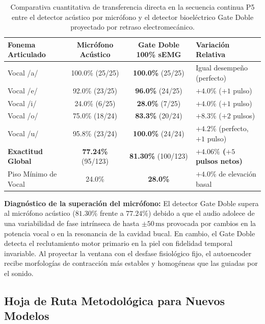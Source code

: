 \documentclass[11pt,a4paper,openany]{book}
\theoremstyle{definition}
\begin{document}
\begin{table}[H]
\centering
\begin{tabularx}{\textwidth}{p{4.5cm} c c X}
\toprule
\textbf{Fonema Articulado} & \textbf{Micrófono Acústico} & \textbf{Gate Doble 100\% sEMG} & \textbf{Variación Relativa} \\
\midrule
Vocal /a/ & 100.0\% (25/25) & \textbf{100.0\%} (25/25) & Igual desempeño (perfecto) \\
Vocal /e/ & 92.0\% (23/25) & \textbf{96.0\%} (24/25) & $+4.0\%$ ($+1$ pulso) \\
Vocal /i/ & 24.0\% (6/25) & \textbf{28.0\%} (7/25) & $+4.0\%$ ($+1$ pulso) \\
Vocal /o/ & 75.0\% (18/24) & \textbf{83.3\%} (20/24) & $+8.3\%$ ($+2$ pulsos) \\
Vocal /u/ & 95.8\% (23/24) & \textbf{100.0\%} (24/24) & $+4.2\%$ (perfecto, $+1$ pulso) \\
\midrule
\textbf{Exactitud Global} & \textbf{77.24\%} (95/123) & \textbf{81.30\%} (100/123) & \textbf{$+4.06\%$ ($+5$ pulsos netos)} \\
Piso Mínimo de Vocal & 24.0\% & \textbf{28.0\%} & $+4.0\%$ de elevación basal \\
\bottomrule
\end{tabularx}
\caption{Comparativa cuantitativa de transferencia directa en la secuencia continua P5 entre el detector acústico por micrófono y el detector bioeléctrico Gate Doble proyectado por retraso electromecánico.}
\label{tab:comparativa_gate_doble}
\end{table}

\textbf{Diagnóstico de la superación del micrófono:}
El detector Gate Doble supera al micrófono acústico ($81.30\%$ frente a $77.24\%$) debido a que el audio adolece de una variabilidad de fase intrínseca de hasta $\pm 50\,\text{ms}$ provocada por cambios en la potencia vocal o en la resonancia de la cavidad bucal. En cambio, el Gate Doble detecta el reclutamiento motor primario en la piel con fidelidad temporal invariable. Al proyectar la ventana con el desfase fisiológico fijo, el autoencoder recibe morfologías de contracción más estables y homogéneas que las guiadas por el sonido.

\subsection{Hoja de Ruta Metodológica para Nuevos Modelos}
\label{subsec:hoja_ruta_gate_doble}
\end{document}
